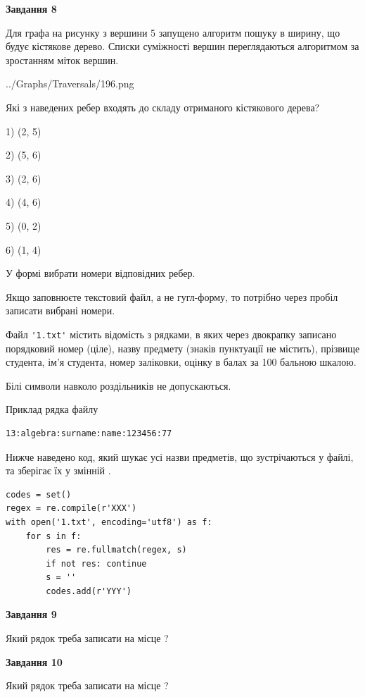\documentclass[12pt, ukrainian]{article}
\def\code#1{\Verb!#1!}
\begin{document}
{\begin {large}
{\begin {center}\textbf{Завдання 8}\end {center}}\par
Для графа на рисунку з вершини 5 запущено алгоритм пошуку в ширину, що будує кістякове дерево. Списки суміжності вершин переглядаються алгоритмом за зростанням міток вершин.\par
\begin{center}
	{../Graphs/Traversals/196.png}
\end{center}
\par Які з наведених ребер входять до складу отриманого кістякового дерева?\par
1) (2, 5)\par
2) (5, 6)\par
3) (2, 6)\par
4) (4, 6)\par
5) (0, 2)\par
6) (1, 4)\par
{\vskip 15pt} У формі вибрати номери відповідних ребер.


Якщо заповнюєте текстовий файл, а не гугл-форму, то потрібно через пробіл записа\-ти вибрані номери.\par
\newpage


Файл \code{'1.txt'} містить відомість з рядками, в яких через двокрапку записано поряд\-ковий номер (ціле), назву предмету (знаків пунктуації не містить), прізвище студента, ім'я студента, номер заліковки, оцінку в балах за 100 бальною шкалою.

Білі символи навколо роздільників не допускаються.

Приклад рядка файлу



\begin{verbatim}
13:algebra:surname:name:123456:77
\end{verbatim}


Нижче наведено код, який шукає усі назви предметів, що зустрічаються у файлі, та зберігає їх у змінній .



\begin{verbatim}
codes = set()
regex = re.compile(r'XXX')
with open('1.txt', encoding='utf8') as f:
    for s in f:
        res = re.fullmatch(regex, s)
        if not res: continue
        s = ''
        codes.add(r'YYY')
\end{verbatim}


{\begin {center}\textbf{Завдання 9}\end {center}}\par
Який рядок треба записати на місце  ?\par
\vspace{5mm}


{\begin {center}\textbf{Завдання 10}\end {center}}\par
Який рядок треба записати на місце  ?\par


\newpage


\end {large}}
\end{document}

